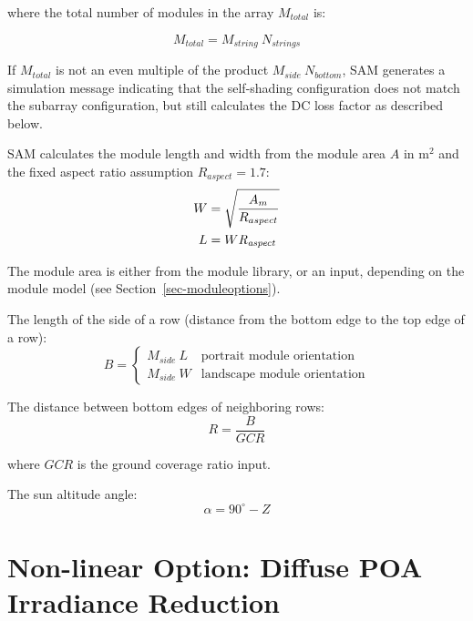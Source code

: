 \documentclass[12pt,letterpaper]{article}
\newcommand\GCR{\ensuremath{\mathit{GCR}}}
\begin{document}
where the total number of modules in the array $M_{total}$ is:

\begin{equation}
M_{total}=M_{string}~N_{strings}
\end{equation}

If $M_{total}$ is not an even multiple of the product $M_{side}~N_{bottom}$, SAM generates a simulation message indicating that the self-shading configuration does not match the subarray configuration, but still calculates the DC loss factor as described below.

SAM calculates the module length and width from the module area $A$ in $\text{m}^2$  and the fixed aspect ratio assumption  $R_{aspect}=1.7$:
\begin{align}
W &= \sqrt{ \frac{A_m}{R_{aspect}}}\notag\\
L &= W \mathit{R_{aspect}}
\end{align}

The module area is either from the module library, or an input, depending on the module model (see Section~\ref{sec-moduleoptions}).

The length of the side of a row (distance from the bottom edge to the top edge of a row):
\begin{equation}
B=
  \left\{
    \begin{array}{ll}
      M_{side}~L & \mbox{portrait module orientation}\\
      M_{side}~W & \mbox{landscape module orientation}
    \end{array}
  \right.
\end{equation}

The distance between bottom edges of neighboring rows:
\begin{equation}
R = \frac{B}{\GCR} 
\end{equation}

where $\GCR$ is the ground coverage ratio input.

The sun altitude angle:
\begin{equation}
\alpha = 90^\circ-Z
\end{equation}

\section{Non-linear Option: Diffuse POA Irradiance Reduction} \label{sec-selfshaddiffuse}
\end{document}
